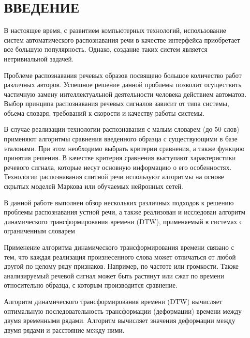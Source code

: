 \documentclass[a4paper,14pt,russian,utf8,nocolumnsxix,nocolumnxxxi,nocolumnxxxii]{eskdtext}
\begin{document}
\tableofcontents %

\pagebreak

\section*{ВВЕДЕНИЕ}
В настоящее время, с развитием компьютерных технологий, использование систем автоматического распознавания речи в качестве интерфейса приобретает все большую популярность. Однако, создание таких систем является нетривиальной задачей.

Проблеме распознавания речевых образов посвящено большое количество работ различных авторов.\cite{mazurenko,vincuk,spokenlang} Успешное решение данной проблемы позволит осуществить частичную замену интеллектуальной деятельности человека действием автоматов. Выбор принципа распознавания речевых сигналов зависит от типа системы, объема словаря, требований к скорости и качеству работы системы. 

В случае реализации технологии распознавания с малым словарем (до 50 слов) применяют алгоритмы сравнения введенного образца с существующими в базе эталонами. При этом необходимо выбрать критерии сравнения, а также функцию принятия решения. В качестве критерия сравнения выступают характеристики речевого сигнала, которые несут основную информацию о его особенностях. Технологии распознавания слитной речи используют алгоритмы на основе скрытых моделей Маркова или обучаемых нейронных сетей.

В данной работе выполнен обзор нескольких различных подходов к решению проблемы распознавания устной речи, а также реализован и исследован алгоритм динамического трансформирования времени (DTW), применяемый в системах с ограниченным словарем

Применение алгоритма динамического трансформирования времени связано с тем, что каждая реализация произнесенного слова может отличаться от любой другой по целому ряду признаков. Например, по частоте или громкости. Также анализируемый речевой сигнал может быть растянут или сжат по времени относительно образца, с которым производится сравнение. 

Алгоритм динамического трансформирования времени (DTW) вычисляет оптимальную последовательность трансформации (деформации) времени между двумя временными рядами. Алгоритм вычисляет значения деформации между двумя рядами и расстояние между ними.\cite{sakoe}
\end{document}
